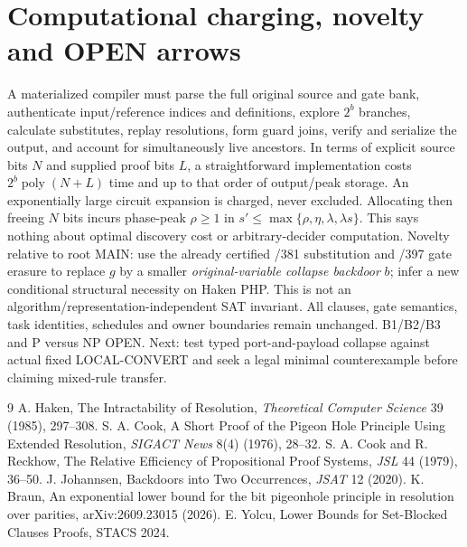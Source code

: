 \documentclass[11pt]{article}
\begin{document}
\section*{Computational charging, novelty and OPEN arrows}
A materialized compiler must parse the full original source and gate bank, authenticate input/reference indices and definitions, explore $2^b$ branches, calculate substitutes, replay resolutions, form guard joins, verify and serialize the output, and account for simultaneously live ancestors. In terms of explicit source bits $N$ and supplied proof bits $L$, a straightforward implementation costs $2^b\operatorname{poly}(N+L)$ time and up to that order of output/peak storage. An exponentially large circuit expansion is charged, never excluded. Allocating then freeing $N$ bits incurs phase-peak $\rho\ge1$ in $s'\le\max\{\rho,\eta,\lambda,\lambda s\}$. This says nothing about optimal discovery cost or arbitrary-decider computation.
Novelty relative to root MAIN: use the already certified /381 substitution and /397 gate erasure to replace $g$ by a smaller \emph{original-variable collapse backdoor} $b$; infer a new conditional structural necessity on Haken PHP. This is not an algorithm/representation-independent SAT invariant. All clauses, gate semantics, task identities, schedules and owner boundaries remain unchanged. B1/B2/B3 and P versus NP OPEN. Next: test typed port-and-payload collapse against actual fixed LOCAL-CONVERT and seek a legal minimal counterexample before claiming mixed-rule transfer.
\begin{thebibliography}{9}
 A. Haken, The Intractability of Resolution, \emph{Theoretical Computer Science} 39 (1985), 297--308.
 S. A. Cook, A Short Proof of the Pigeon Hole Principle Using Extended Resolution, \emph{SIGACT News} 8(4) (1976), 28--32.
 S. A. Cook and R. Reckhow, The Relative Efficiency of Propositional Proof Systems, \emph{JSL} 44 (1979), 36--50.
 J. Johannsen, Backdoors into Two Occurrences, \emph{JSAT} 12 (2020).
 K. Braun, An exponential lower bound for the bit pigeonhole principle in resolution over parities, arXiv:2609.23015 (2026).
 E. Yolcu, Lower Bounds for Set-Blocked Clauses Proofs, STACS 2024.
\end{thebibliography}
\end{document}
